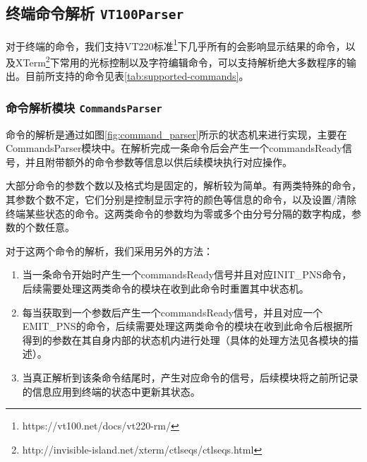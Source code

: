  
\subsection{终端命令解析 \texttt{VT100Parser}}

对于终端的命令，我们支持VT220标准\footnote{https://vt100.net/docs/vt220-rm/}下几乎所有的会影响显示结果的命令，以及XTerm\footnote{http://invisible-island.net/xterm/ctlseqs/ctlseqs.html}下常用的光标控制以及字符编辑命令，可以支持解析绝大多数程序的输出。目前所支持的命令见表\ref{tab:supported-commands}。


\subsubsection{命令解析模块 \texttt{CommandsParser}}
命令的解析是通过如图\ref{fig:command_parser}所示的状态机来进行实现，主要在CommandsParser模块中。在解析完成一条命令后会产生一个commandsReady信号，并且附带额外的命令参数等信息以供后续模块执行对应操作。

大部分命令的参数个数以及格式均是固定的，解析较为简单。有两类特殊的命令，其参数个数不定，它们分别是控制显示字符的颜色等信息的命令，以及设置/清除终端某些状态的命令。这两类命令的参数均为零或多个由分号分隔的数字构成，参数的个数任意。

对于这两个命令的解析，我们采用另外的方法：

\begin{enumerate}
	\item 当一条命令开始时产生一个commandsReady信号并且对应INIT\_PNS命令，后续需要处理这两类命令的模块在收到此命令时重置其中状态机。
	\item 每当获取到一个参数后产生一个commandsReady信号，并且对应一个EMIT\_PNS的命令，后续需要处理这两类命令的模块在收到此命令后根据所得到的参数在其自身内部的状态机内进行处理（具体的处理方法见各模块的描述）。
	\item 当真正解析到该条命令结尾时，产生对应命令的信号，后续模块将之前所记录的信息应用到终端的状态中更新其状态。
\end{enumerate}

